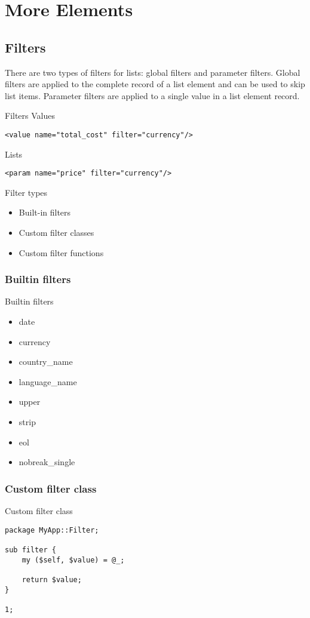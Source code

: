 \section{More Elements}
\subsection{Filters}
There are two types of filters for lists: global filters and
parameter filters. Global filters are applied to the complete
record of a list element and can be used to skip list items.
Parameter filters are applied to a single value in a list
element record.

\begin{frame}[fragile]{Filters}
Values
\begin{lstlisting}
<value name="total_cost" filter="currency"/>
\end{lstlisting}
Lists
\begin{lstlisting}
<param name="price" filter="currency"/>
\end{lstlisting}

\end{frame}

\begin{frame}{Filter types}
\begin{itemize}
\item{Built-in filters}
\item{Custom filter classes}
\item{Custom filter functions}
\end{itemize}
\end{frame}

\subsubsection{Builtin filters}
\begin{frame}{Builtin filters}
\begin{itemize}
\item date
\item currency
\item country\_name
\item language\_name
\item upper
\item strip
\item eol
\item nobreak\_single
\end{itemize}
\end{frame}

\subsubsection{Custom filter class}
\begin{frame}[fragile]{Custom filter class}
\begin{lstlisting}
package MyApp::Filter;

sub filter {
    my ($self, $value) = @_;

    return $value;
}

1;
\end{lstlisting}
\end{frame}

